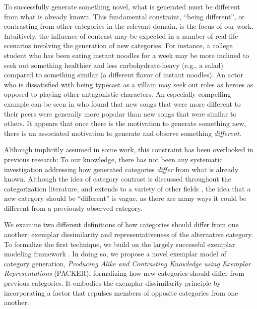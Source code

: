 \documentclass[pdflatex,sn-apa]{sn-jnl}%
\theoremstyle{thmstyleone}%
\theoremstyle{thmstyletwo}%
\theoremstyle{thmstylethree}%
\begin{document}
To successfully generate something novel, what is generated must be different
from what is already known. This fundamental constraint, ``being different'', or
contrasting from other categories in the relevant domain, is the focus of our
work. Intuitively, the influence of contrast may be expected in a number of
real-life scenarios involving the generation of new categories. For instance, a
college student who has been eating instant noodles for a week may be more
inclined to seek out something healthier and less carbohydrate-heavy (e.g., a salad) compared to something similar (a different flavor of instant
noodles). An actor who is dissatisfied with being typecast as a villain may seek
out roles as heroes as opposed to playing other antagonistic characters. An
especially compelling example can be seen in \cite{askin2017} who found that new
songs that were more different to their peers were generally more popular than
new songs that were similar to others. It appears that once there is the
motivation to generate something new, there is an associated motivation to
generate and observe something \emph{different}.

Although implicitly assumed in some work, this constraint has been
overlooked in previous research: To our knowledge, there has not been any
systematic investigation addressing how generated categories {\em differ} from
what is already known. Although the idea of category contrast is discussed
throughout the categorization literature, and extends to a variety of other
fields \citep[e.g., color;][]{regier2007}, the idea that a new category should
be ``different'' is vague, as there are many ways it could be different from a
previously observed category.

We examine two different definitions of how categories should differ from one
another: exemplar dissimilarity and representativeness of the alternative
category. To formalize the first technique, we build on the largely successful
exemplar modeling framework
\citep{medin1978context,nosofsky1984choice,nosofsky1986attention}. In doing so,
we propose a novel exemplar model of category generation, {\em Producing Alike
  and Contrasting Knowledge using Exemplar Representations} (PACKER),
formalizing how new categories should differ from previous categories. It
embodies the exemplar dissimilarity principle by incorporating a factor that
repulses members of opposite categories from one another.
\end{document}
